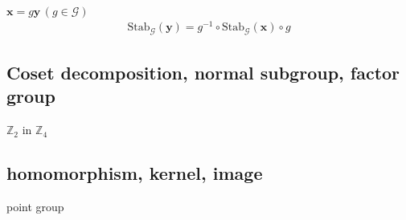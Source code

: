 $\bm{x} = g \bm{y} \, (g \in \mathcal{G})$
\begin{align}
  \mathrm{Stab}_{\mathcal{G}}(\bm{y}) = g^{-1} \circ \mathrm{Stab}_{\mathcal{G}}(\bm{x}) \circ g
\end{align}




\subsection{Coset decomposition, normal subgroup, factor group}


$\mathbb{Z}_{2}$ in $\mathbb{Z}_{4}$

\subsection{homomorphism, kernel, image}

point group
